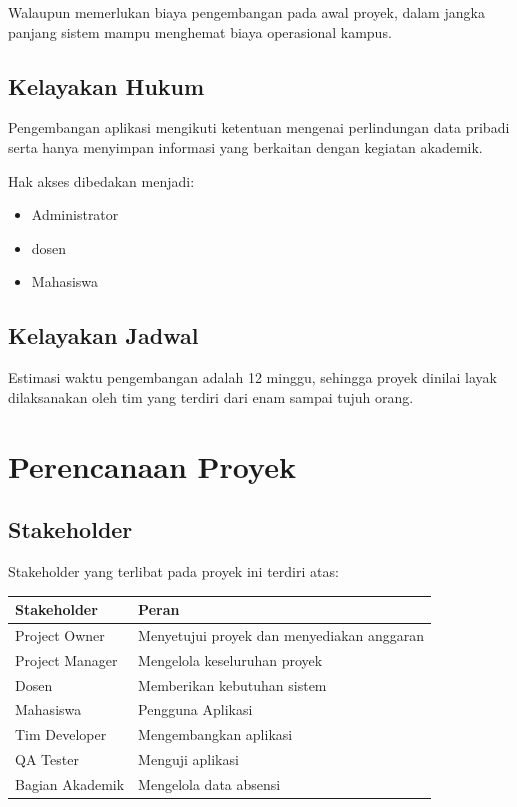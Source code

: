 \documentclass[12pt,a4paper]{article}
\begin{document}
Walaupun memerlukan biaya pengembangan pada awal proyek, dalam jangka panjang sistem mampu menghemat biaya operasional kampus.

\subsection{Kelayakan Hukum}

Pengembangan aplikasi mengikuti ketentuan mengenai perlindungan data pribadi serta hanya menyimpan informasi yang berkaitan dengan kegiatan akademik.

Hak akses dibedakan menjadi:
\begin{itemize}
    \item Administrator
    \item dosen
    \item Mahasiswa
\end{itemize}

\subsection{Kelayakan Jadwal}

Estimasi waktu pengembangan adalah 12 minggu, sehingga proyek dinilai layak dilaksanakan oleh tim yang terdiri dari enam sampai tujuh orang.


\section{Perencanaan Proyek}

\subsection{Stakeholder}

Stakeholder yang terlibat pada proyek ini terdiri atas:

\begin{table}[H]
\centering
\begin{tabular}{ll}
\toprule
Stakeholder & Peran\\
\midrule
Project Owner & Menyetujui proyek dan menyediakan anggaran\\
Project Manager & Mengelola keseluruhan proyek\\
Dosen & Memberikan kebutuhan sistem\\
Mahasiswa & Pengguna Aplikasi\\
Tim Developer & Mengembangkan aplikasi\\
QA Tester & Menguji aplikasi\\
Bagian Akademik & Mengelola data absensi\\
\bottomrule
\end{tabular}
\end{table}
\end{document}
